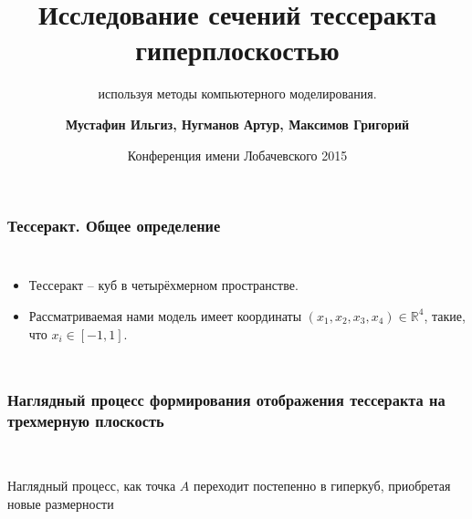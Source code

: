 \documentclass[10pt,pdf,hyperref={unicode}]{beamer}
\title[Математическая модель проекции тессеракта и его сечений гиперплоскостью] %
{ \bfseries Исследование сечений тессеракта гиперплоскостью}
\subtitle{используя методы компьютерного моделирования.}
\author[Мустафин И., Нугманов А., Максимов Г.]
{ \bfseries Мустафин Ильгиз, Нугманов Артур, Максимов Григорий}
\institute[ТТЛ №2] %
{
  \vspace{0.2cm}
  {\bfseries Научный руководитель -- Давлетбаев Марсель Фанилевич} \\
  \vspace{0.2cm}

  { \normalsize МАОУ "Лицей-интернат №2"} \\
  Московского района города Казани
}
\date[2015-03-26] %
{Конференция имени Лобачевского 2015}
\begin{document}
\frame{\titlepage}

\begin{frame}
\frametitle{Тессеракт. Общее определение}
\begin{columns}
{
	\begin{itemize}
		\item Тессеракт -- куб в четырёхмерном пространстве.
		\item Рассматриваемая нами модель имеет координаты
			$(x_1,x_2,x_3,x_4) \in \mathbb{R}^4$, такие, что $x_i \in [ -1,1 ]$.
	\end{itemize}
}
\clearpage
\end{columns}
\end{frame}

\begin{frame}
\frametitle{Наглядный процесс формирования отображения тессеракта на трехмерную плоскость}
\begin{center}
	 \\
\end{center}
Наглядный процесс, как точка $A$ переходит постепенно в гиперкуб, приобретая новые размерности
\end{frame}
\end{document}
